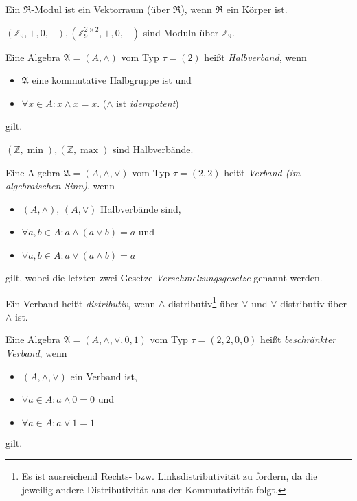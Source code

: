 \begin{remark}
    Ein $\mathfrak{R}$-Modul ist ein Vektorraum (über $\mathfrak{R}$), wenn $\mathfrak{R}$ ein Körper ist.
\end{remark}

\begin{example}
    $(\mathbb{Z}_9, +, 0, -), (\mathbb{Z}_9^{2 \times 2}, +, 0, -)$ sind Moduln über $\mathbb{Z}_9$.
\end{example}

\begin{definition}
    Eine Algebra $\mathfrak{A} = (A, \wedge)$ vom Typ $\tau = (2)$ heißt \emph{Halbverband}, wenn
    \begin{itemize}[topsep=0pt, label={--}]
        \item $\mathfrak{A}$ eine kommutative Halbgruppe ist und
        \item $\forall x \in A: x \wedge x = x$. \tab ($\wedge$ ist \emph{idempotent})
    \end{itemize}
    gilt.
\end{definition}

\begin{remark}
    $(\mathbb{Z}, \min), (\mathbb{Z}, \max)$ sind Halbverbände.
\end{remark}

\begin{definition}
    Eine Algebra $\mathfrak{A} = (A, \wedge, \vee)$ vom Typ $\tau = (2, 2)$ heißt \emph{Verband (im algebraischen Sinn)}, wenn
    \begin{itemize}[topsep=0pt, label={--}]
        \item $(A, \wedge)$, $(A, \vee)$ Halbverbände sind, 
        \item $\forall a,b \in A: a \wedge (a \vee b) = a$ und
        \item $\forall a,b \in A: a \vee (a \wedge b) = a$
    \end{itemize}
    gilt, wobei die letzten zwei Gesetze \emph{Verschmelzungsgesetze} genannt werden.

    Ein Verband heißt \emph{distributiv}, wenn $\wedge$ distributiv\footnote{Es ist ausreichend Rechts- bzw. Linksdistributivität zu fordern, da die jeweilig andere Distributivität aus der Kommutativität folgt.} über $\vee$ und $\vee$ distributiv über $\wedge$ ist.

    Eine Algebra $\mathfrak{A} = (A, \wedge, \vee, 0, 1)$ vom Typ $\tau = (2,2,0,0)$ heißt \emph{beschränkter Verband}, wenn
    \begin{itemize}[topsep=0pt, label={--}]
        \item $(A, \wedge, \vee)$ ein Verband ist,
        \item $\forall a \in A: a \wedge 0 = 0$ und
        \item $\forall a \in A: a \vee 1 = 1$
    \end{itemize}
    gilt.
\end{definition}

